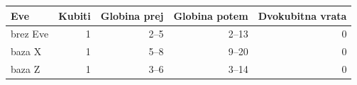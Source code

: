 \begin{tabular}{lrrrr}
\toprule
Eve & Kubiti & Globina prej & Globina potem & Dvokubitna vrata \\
\midrule
brez Eve & 1 & 2--5 & 2--13 & 0 \\
baza X & 1 & 5--8 & 9--20 & 0 \\
baza Z & 1 & 3--6 & 3--14 & 0 \\
\bottomrule
\end{tabular}
